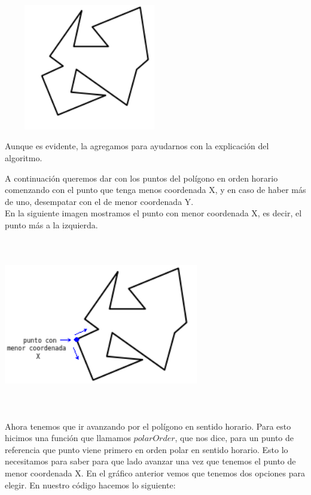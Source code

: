 \documentclass[a4paper]{article}
\begin{document}
\begin{center}
\includegraphics[width=7.5cm,height=5.5cm,keepaspectratio]{poligono.png}
\end{center}

Aunque es evidente, la agregamos para ayudarnos con la explicación del algoritmo.

A continuación queremos dar con los puntos del polígono en orden horario comenzando con el punto que tenga menos coordenada X, y en caso de haber más de uno, desempatar con el de menor coordenada Y.\\

En la siguiente imagen mostramos el punto con menor coordenada X, es decir, el punto más a la izquierda.

\begin{center}
\hspace*{-2cm}
\includegraphics[width=8.5cm,height=7.5cm,keepaspectratio]{poligonoConPuntoMin.png}
\end{center}

Ahora tenemos que ir avanzando por el polígono en sentido horario. Para esto hicimos una función que llamamos $polarOrder$, que nos dice, para un punto de referencia que punto viene primero en orden polar en sentido horario. Esto lo necesitamos para saber para que lado avanzar una vez que tenemos el punto de menor coordenada X. En el gráfico anterior vemos que tenemos dos opciones para elegir.
En nuestro código hacemos lo siguiente:
\end{document}
